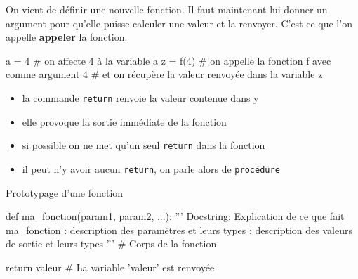 		On vient de définir une nouvelle fonction. Il faut maintenant lui donner un argument pour qu'elle puisse calculer une valeur et la renvoyer. C'est ce que l'on appelle \textbf{appeler} la fonction.
	\begin{CodePythontexAlt}[TaillePolice=\normalsize, Largeur=1\linewidth,Centre,PremLigne=1, Lignes=false,]{}
			a = 4   		# on affecte 4 à la variable a
			z = f(4)		# on appelle la fonction f avec comme argument 4 
							# et on récupère la valeur renvoyée dans la variable z
		\end{CodePythontexAlt}

\begin{itemize}
		\item la commande \verb+return+ renvoie la valeur contenue dans y
		\item elle provoque la sortie immédiate de la fonction
		\item si possible on ne met qu'un seul \verb+return+ dans la fonction
		\item il peut n'y avoir aucun \verb+return+, on parle alors de \verb+procédure+
\end{itemize}

\medskip

\begin{easybox}{Prototypage d'une fonction}
	\begin{CodePythontexAlt}[TaillePolice=\normalsize, Largeur=1\linewidth,Centre,PremLigne=1, Lignes=true,]{}
		def ma_fonction(param1, param2, ...):
			''' Docstring: Explication de ce que fait ma_fonction
			: description des paramètres et leurs types
			: description des valeurs de sortie et leurs types '''
			# Corps de la fonction

			return valeur	# La variable 'valeur' est renvoyée
	\end{CodePythontexAlt}
\end{easybox}


